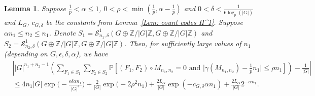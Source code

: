 \documentclass[12pt]{amsart}
\newtheorem{lemma}[theorem]{Lemma}
\theoremstyle{definition}
\newcommand{\PPP}{\mathbb{P}}
\newcommand{\SSO}[3]{\mathcal{S}^1_{#1}(#2,#3)}
\newcommand{\Mnot}{M_{n_1,n_2}}
\newcommand{\ZG}{\Z/\abs{G}\Z}
\newcommand{\abs}[1]{\vert#1\vert}
\newcommand{\Z}{\mathbb{Z}}
\begin{document}
\begin{lemma}
Suppose $\frac{1}{p}<\alpha\leq 1$, $0<\rho<\min(\frac{1}{p},\alpha-\frac{1}{p})$ and $0<\delta<\frac{1}{6\log_p(\abs{G})}$ and $L_{G}$, $c_{G,\delta}$ be the constants from Lemma~\ref{Lem: count codes H^1}.
Suppose $\alpha n_1\leq n_2\leq n_1$.
Denote $S_1=\SSO{n_1,\delta}{G\oplus\ZG}{G\oplus\ZG}$ and $S_2=\SSO{n_2,\delta}{G\oplus\ZG}{G\oplus\ZG}$.
Then, for sufficiently large values of $n_1$ (depending on $G,\epsilon,\delta,\alpha$), we have
\begin{align*}
&\left|
\abs{G}^{n_1+n_2-1}\left(
\sum_{F_1\in S_1}
\sum_{F_2\in S_2}
\PPP[(F_1,F_2)\circ \Mnot=0 \text{ and }
\abs{\gamma(\Mnot) -\tfrac{1}{p} n_1}\leq \rho n_1] 
\right)
- \frac{1}{\abs{G}}
\right|\\
&\leq 4n_1\abs{G} \exp\Big(-\frac{\epsilon\delta \alpha n_1}{|G|^4}\Big)
+ \frac{2}{\abs{G}}\exp\big(-2\rho^2 n_1\big)
+\frac{2 L_G}{\abs{G}} \exp(-c_{G,\delta}\alpha n_1)
+\frac{2 L_G}{\abs{G}} 2^{-\alpha n_1}.
\end{align*}
\end{lemma}
\end{document}
